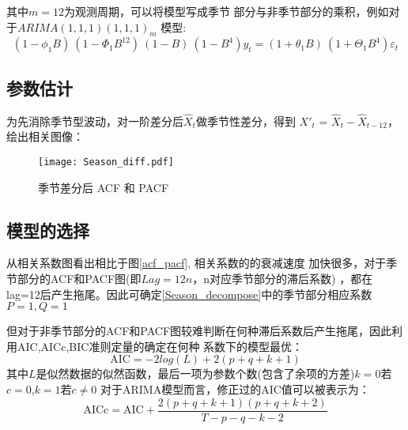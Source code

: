 \documentclass[12pt,a4paper]{nmmcm}
\begin{document}
其中\(m=12\)为观测周期，可以将模型写成季节
部分与非季节部分的乘积，例如对于\(ARIMA(1,1,1)(1,1,1)_m\)
模型:
\begin{equation}
  (1 - \phi_{1}B)~(1 - \Phi_{1}B^{12})~(1 - B)~(1 - B^{4})y_{t} = (1 + \theta_{1}B)~ (1 + \Theta_{1}B^{4})\varepsilon_{t}
\end{equation}

 \subsection{参数估计}
 为先消除季节型波动，对一阶差分后\(\hat{X}_t\)做季节性差分，得到
 \(X'_{t}\) = \(\hat{X}_t-\hat{X}_{t-12}\)，绘出相关图像：
 \begin{figure}[H] %
  \centering %
  \texttt{[image: Season\_diff.pdf]} %
  \caption{季节差分后 ACF 和 PACF} %
  \label{season_diff} %
  \end{figure}
  \subsection{模型的选择}
  从相关系数图看出相比于图\ref{acf_pacf}, 相关系数的的衰减速度
  加快很多，对于季节部分的ACF和PACF图(即\(Lag=12n\)，n对应季节部分的滞后系数)
  ，都在lag=12后产生拖尾。因此可确定\ref{Season_decompose}中的季节部分相应系数\(P=1 , Q=1\)

  但对于非季节部分的ACF和PACF图较难判断在何种滞后系数后产生拖尾，因此利用AIC,AICc,BIC准则定量的确定在何种
  系数下的模型最优：
  \begin{equation*}
    \text{AIC} = -2log(L) + 2(p+q+k+1)
  \end{equation*}
  其中\(L\)是似然数据的似然函数，最后一项为参数个数(包含了余项的方差)\(k=0\)若\(c=0\),\(k=1\)若\(c\neq0\)
  对于ARIMA模型而言，修正过的AIC值可以被表示为\cite{Rob}：
  \begin{equation*}
    \text{AICc} = \text{AIC} + \frac{2(p+q+k+1)(p+q+k+2)}{T-p-q-k-2}
  \end{equation*}
\end{document}
